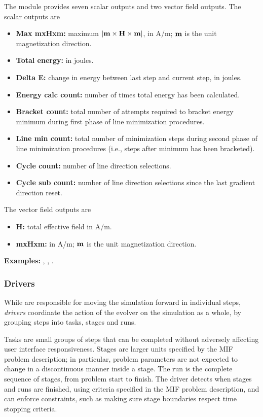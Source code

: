 \begin{description}
The  module provides seven scalar outputs and two vector
field outputs.  The scalar outputs are
\begin{itemize}
\item \textbf{Max mxHxm:} maximum $|\textbf{m}\times\textbf{H}\times\textbf{m}|$, in A/m;
   $\textbf{m}$ is the unit magnetization direction.
\item \textbf{Total energy:} in joules.
\item \textbf{Delta E:} change in energy between last step and current
   step, in joules.
\item \textbf{Energy calc count:} number of times total energy has been
   calculated.
\item \textbf{Bracket count:} total number of attempts required to
   bracket energy minimum during first phase of line minimization
   procedures.
\item \textbf{Line min count:} total number of minimization steps during
   second phase of line minimization procedures (i.e., steps after
   minimum has been bracketed).
\item \textbf{Cycle count:} number of line direction selections.
\item \textbf{Cycle sub count:} number of line direction selections
  since the last gradient direction reset.
\end{itemize}

The vector field outputs are
\begin{itemize}
\item \textbf{H:} total effective field in A/m.
\item \textbf{mxHxm:} in A/m; $\textbf{m}$ is the unit magnetization
   direction.
\end{itemize}

\textbf{Examples:} , , .

\end{description}

\subsubsection{Drivers\label{sec:oxsDrivers}}
While  are
responsible for moving the simulation forward in individual steps,
\textit{drivers} coordinate the action of the evolver on the
simulation as a whole, by grouping steps into tasks, stages and runs.

Tasks are small groups of steps that can be completed without adversely
affecting user interface responsiveness.  Stages are larger units
specified by the MIF problem description; in particular, problem
parameters are not expected to change in a discontinuous manner inside a
stage.  The run is the complete sequence of stages, from problem start to
finish.  The driver detects when stages and runs are finished, using
criteria specified in the MIF problem description, and can enforce
constraints, such as making sure stage boundaries respect time stopping
criteria.

